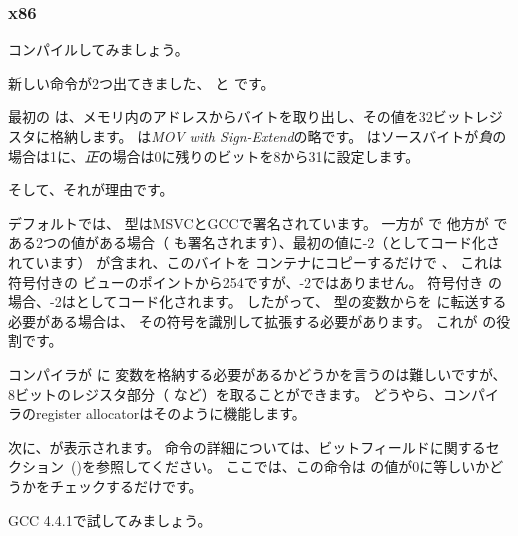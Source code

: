 ﻿\subsubsection{x86}


コンパイルしてみましょう。




新しい命令が2つ出てきました、 \MOVSX と \TEST です。

\label{MOVSX}

最初の \MOVSX は、メモリ内のアドレスからバイトを取り出し、その値を32ビットレジスタに格納します。 
\MOVSX は\emph{MOV with Sign-Extend}の略です。 
\MOVSX はソースバイトが\emph{負}の場合は1に、\emph{正}の場合は0に残りのビットを8から31に設定します。

そして、それが理由です。

デフォルトでは、 \Tchar 型はMSVCとGCCで署名されています。 一方が \Tchar で
他方が \Tint である2つの値がある場合（ \Tint も署名されます）、最初の値に-2（としてコード化されています）
が含まれ、このバイトを \Tint コンテナにコピーするだけで 、
これは符号付きの \Tint ビューのポイントから254ですが、-2ではありません。
符号付き \Tint の場合、-2はとしてコード化されます。 
したがって、 \Tchar 型の変数からを \Tint に転送する必要がある場合は、
その符号を識別して拡張する必要があります。 これが \MOVSX の役割です。

コンパイラが \EDX に \Tchar 変数を格納する必要があるかどうかを言うのは難しいですが、
8ビットのレジスタ部分（ \DL など）を取ることができます。 どうやら、コンパイラの\gls{register allocator}はそのように機能します。


次に、が表示されます。 
\TEST 命令の詳細については、ビットフィールドに関するセクション~()を参照してください。 
ここでは、この命令は \EDX の値が0に等しいかどうかをチェックするだけです。


GCC 4.4.1で試してみましょう。



\label{movzx}


